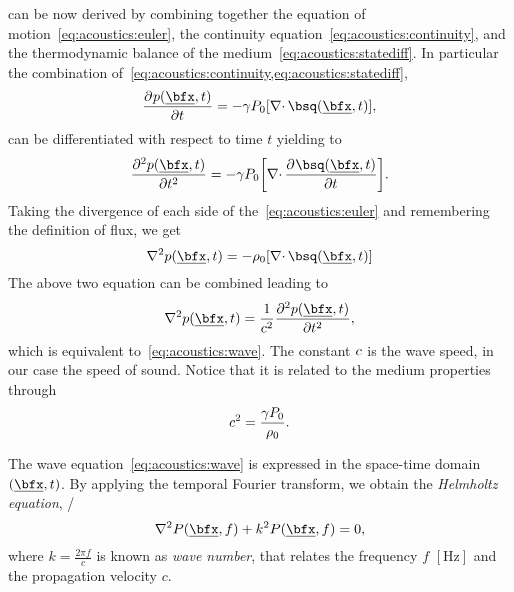  can be now derived by combining together
the equation of motion~\eqref{eq:acoustics:euler},
the continuity equation~\eqref{eq:acoustics:continuity},
and the thermodynamic balance of the medium~\eqref{eq:acoustics:statediff}.
In particular the combination of~\cref{eq:acoustics:continuity,eq:acoustics:statediff},
\begin{equation}
    \kpderiv[]{\pressureSpaceTime}{t} = - \gamma P_0 \kbracket{\divergence{\flux\depSpaceTime}}
    ,
\end{equation}
can be differentiated with respect to time $t$ yielding to
\begin{equation}
    \kpderiv[2]{\pressureSpaceTime}{t} = - \gamma P_0 \kbracket{\divergence{\kpderiv[]{\flux\depSpaceTime}{t}}}
    .
\end{equation}
Taking the divergence of each side of the~\cref{eq:acoustics:euler} and remembering the definition of flux, we get
\begin{equation}
    \knabla^2 \pressureSpaceTime = -\densityEq \kbracket{\divergence{\flux\depSpaceTime}}
\end{equation}
The above two equation can be combined leading to
\begin{equation}
    \knabla^2 \pressureSpaceTime = \frac{1}{\speedOfSound^2} \kpderiv[2]{\pressureSpaceTime}{t}
    ,
\end{equation}
which is equivalent to~\cref{eq:acoustics:wave}.
The constant $c$ is the wave speed, in our case the speed of sound.
Notice that it is related to the medium properties through
\begin{equation}
    c^2 = \frac{\gamma P_0}{\rho_0}
    .
\end{equation}

The wave equation~\ref{eq:acoustics:wave} is expressed in the space-time domain $\depSpaceTime$.
By applying the temporal Fourier transform, we obtain the \textit{Helmholtz equation}, \ie/
\begin{equation}
    \label{eq:acoustics:helmholtz}
    \knabla^2 P(\positionMicrophone, f) + k^2 P(\positionMicrophone, f) = 0
    ,
\end{equation}
where $k = \frac{2 \pi f}{c}$ is known as \textit{wave number}, that relates the frequency $f$ $[\si{\hertz}]$ and the propagation velocity $c$.

